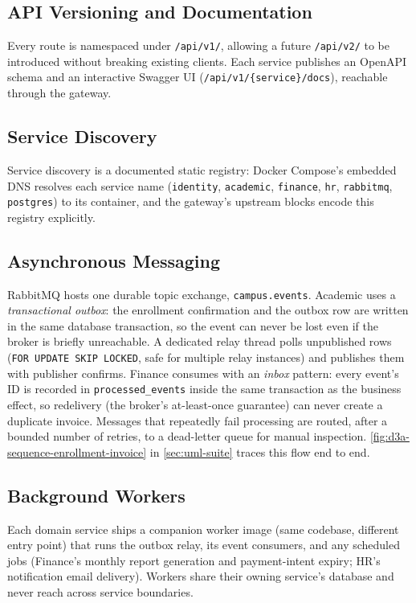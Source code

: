 \subsection{API Versioning and Documentation}
Every route is namespaced under \texttt{/api/v1/}, allowing a future
\texttt{/api/v2/} to be introduced without breaking existing clients. Each
service publishes an OpenAPI schema and an interactive Swagger UI
(\texttt{/api/v1/\{service\}/docs}), reachable through the gateway.

\subsection{Service Discovery}
Service discovery is a documented static registry: Docker Compose's embedded
DNS resolves each service name (\texttt{identity}, \texttt{academic},
\texttt{finance}, \texttt{hr}, \texttt{rabbitmq}, \texttt{postgres}) to its
container, and the gateway's upstream blocks encode this registry explicitly.

\subsection{Asynchronous Messaging}
RabbitMQ hosts one durable topic exchange, \texttt{campus.events}. Academic
uses a \emph{transactional outbox}: the enrollment confirmation and the
outbox row are written in the same database transaction, so the event can
never be lost even if the broker is briefly unreachable. A dedicated relay
thread polls unpublished rows (\texttt{FOR UPDATE SKIP LOCKED}, safe for
multiple relay instances) and publishes them with publisher confirms. Finance
consumes with an \emph{inbox} pattern: every event's ID is recorded in
\texttt{processed\_events} inside the same transaction as the business effect,
so redelivery (the broker's at-least-once guarantee) can never create a
duplicate invoice. Messages that repeatedly fail processing are routed, after
a bounded number of retries, to a dead-letter queue for manual inspection.
\cref{fig:d3a-sequence-enrollment-invoice} in \cref{sec:uml-suite} traces this
flow end to end.

\subsection{Background Workers}
Each domain service ships a companion worker image (same codebase, different
entry point) that runs the outbox relay, its event consumers, and any
scheduled jobs (Finance's monthly report generation and payment-intent
expiry; HR's notification email delivery). Workers share their owning
service's database and never reach across service boundaries.

